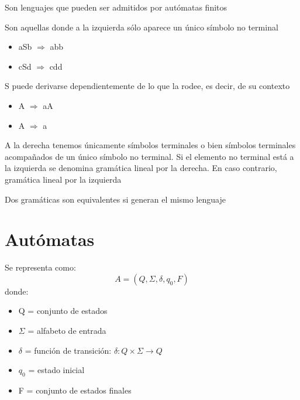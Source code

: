 \documentclass{apuntes}
\begin{document}
\begin{defn}
Son lenguajes que pueden ser admitidos por autómatas finitos
\end{defn}

\begin{defn}
Son aquellas donde a la izquierda sólo aparece un único símbolo no terminal
\end{defn}


\begin{example}
\begin{itemize}
\item aSb $\Rightarrow$ abb
\item cSd $\Rightarrow$ cdd
\end{itemize}
S puede derivarse dependientemente de lo que la rodee, es decir, de su contexto
\end{example}

\begin{example}
\begin{itemize}
\item A $\Rightarrow$ aA
\item A $\Rightarrow$ a
\end{itemize}
A la derecha tenemos únicamente símbolos terminales o bien símbolos terminales acompañados de un único símbolo no terminal.
Si el elemento no terminal está a la izquierda se denomina gramática lineal por la derecha. En caso contrario, gramática lineal por la izquierda
\end{example}

\begin{defn}
Dos gramáticas son equivalentes si generan el mismo lenguaje
\end{defn}

\chapter{Autómatas}
\begin{defn}[Automata]
Se representa como:
\[ A=(Q, \Sigma, \delta, q_0, F)\]
 donde:
\begin{itemize}
\item Q = conjunto de estados
\item $\Sigma$ =  alfabeto de entrada
\item $\delta$ = función de transición: $\delta : Q\times \Sigma \rightarrow Q$
\item $q_0$ = estado inicial
\item F = conjunto de estados finales
\end{itemize}
\end{defn}
\end{document}
